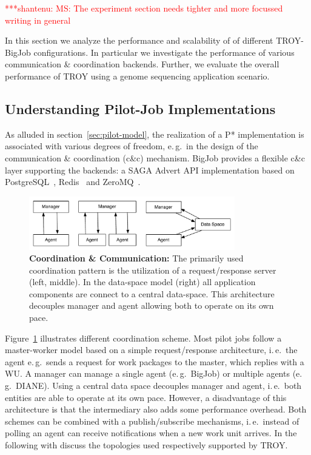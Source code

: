 \documentclass[conference,final]{IEEEtran}
\newcommand{\jhanote}[1]{ {\textcolor{red} { ***shantenu: #1 }}}
\newcommand{\jhanote}[1]{}
\begin{document}
\jhanote{MS: The experiment section needs tighter and more focussed
  writing in general}

In this section we analyze the performance and scalability of of different 
TROY-BigJob configurations. In particular we investigate the performance 
of various communication \& coordination backends. Further, we evaluate the 
overall performance of TROY using a genome sequencing application scenario.

\subsection{Understanding Pilot-Job Implementations}

As alluded in section~\ref{sec:pilot-model}, the realization of a P*
implementation is associated with various degrees of freedom, e.\,g.\ in the
design of the communication \& coordination (c\&c) mechanism. BigJob provides
a flexible c\&c layer supporting the backends: a SAGA Advert API
implementation based on PostgreSQL~\cite{saga_advert}, Redis~\cite{redis} and
ZeroMQ~\cite{zmq}.

\begin{figure}[htbp]
	\centering		
	\includegraphics[width=0.8\textwidth]{figures/coordination-schemes.pdf}
	\caption{\textbf{Coordination \& Communication:} The primarily used 
	coordination pattern is the utilization of a request/response server 
	(left, middle). In the data-space model (right) all application components 
	are connect to a central data-space. This architecture decouples manager 
	and agent allowing both to operate on its own pace.}
	\label{fig:figures_coordination-schemes}
\end{figure}

Figure~\ref{fig:figures_coordination-schemes} illustrates different
coordination scheme. Most pilot jobs follow a master-worker model based on a
simple request/response architecture, i.\,e.\ the agent e.\,g.\ sends a
request for work packages to the master, which replies with a WU. A manager
can manage a single agent (e.\,g.\ BigJob) or multiple agents (e.\,g.\ DIANE).
Using a central data space decouples manager and agent, i.\,e.\ both entities 
are able to operate at its own pace. However, a disadvantage of this 
architecture is that the intermediary also adds some performance overhead. 
Both schemes can be combined with a publish/subscribe mechanisms, i.\,e.\ 
instead of polling an agent can receive notifications when a new work unit 
arrives. In the following with discuss the topologies used respectively 
supported by TROY.
\end{document}
